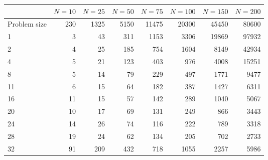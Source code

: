 \begin{tabular}{lrrrrrrr}
\toprule
{} & $N = 10$ & $N = 25$ & $N = 50$ & $N = 75$ & $N = 100$ & $N = 150$ & $N = 200$ \\
\midrule
Problem size &      230 &     1325 &     5150 &    11475 &     20300 &     45450 &     80600 \\
\midrule
1            &        3 &       43 &      311 &     1153 &      3306 &     19869 &     97932 \\
2            &        4 &       25 &      185 &      754 &      1604 &      8149 &     42934 \\
4            &        5 &       21 &      123 &      403 &       976 &      4008 &     15251 \\
8            &        5 &       14 &       79 &      229 &       497 &      1771 &      9477 \\
11           &        6 &       15 &       64 &      182 &       387 &      1427 &      6311 \\
16           &       11 &       15 &       57 &      142 &       289 &      1040 &      5067 \\
20           &       10 &       17 &       69 &      131 &       249 &       866 &      3443 \\
24           &       14 &       26 &       74 &      116 &       222 &       789 &      3318 \\
28           &       19 &       24 &       62 &      134 &       205 &       702 &      2733 \\
32           &       91 &      209 &      432 &      718 &      1055 &      2257 &      5986 \\
\bottomrule
\end{tabular}